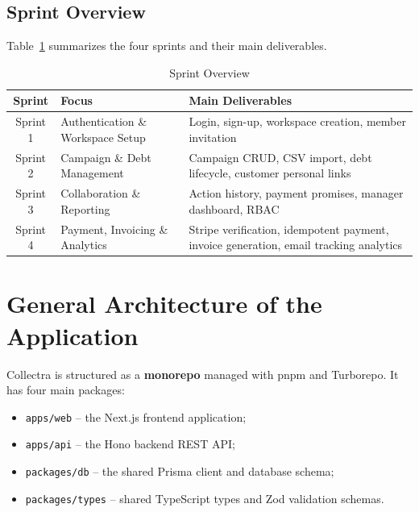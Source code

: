 \documentclass[12pt,a4paper]{report}
\begin{document}
\subsection{Sprint Overview}

Table~\ref{tab:sprints} summarizes the four sprints and their main deliverables.

\begin{table}[H]
  \centering
  \renewcommand{\arraystretch}{1.3}
  \begin{tabular}{|c|p{4.5cm}|p{6.5cm}|}
    \hline
    \textbf{Sprint} & \textbf{Focus} & \textbf{Main Deliverables} \\
    \hline
    Sprint 1 & Authentication \& Workspace Setup   & Login, sign-up, workspace creation, member invitation \\
    \hline
    Sprint 2 & Campaign \& Debt Management          & Campaign CRUD, CSV import, debt lifecycle, customer personal links \\
    \hline
    Sprint 3 & Collaboration \& Reporting           & Action history, payment promises, manager dashboard, RBAC \\
    \hline
    Sprint 4 & Payment, Invoicing \& Analytics      & Stripe verification, idempotent payment, invoice generation, email tracking analytics \\
    \hline
  \end{tabular}
  \caption{Sprint Overview}
  \label{tab:sprints}
\end{table}


\section{General Architecture of the Application}

Collectra is structured as a \textbf{monorepo} managed with pnpm and Turborepo.
It has four main packages:
\begin{itemize}
  \item \texttt{apps/web} -- the Next.js frontend application;
  \item \texttt{apps/api} -- the Hono backend REST API;
  \item \texttt{packages/db} -- the shared Prisma client and database schema;
  \item \texttt{packages/types} -- shared TypeScript types and Zod validation
        schemas.
\end{itemize}
\end{document}
